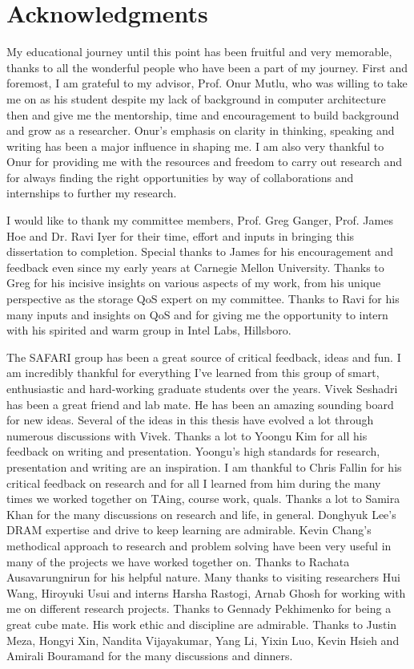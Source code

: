 \chapter*{Acknowledgments}
My educational journey until this point has been fruitful and very
memorable, thanks to all the wonderful people who have been a part
of my journey. First and foremost, I am grateful to my advisor,
Prof. Onur Mutlu, who was willing to take me on as his student
despite my lack of background in computer architecture then and
give me the mentorship, time and encouragement to build
background and grow as a researcher. Onur's emphasis on clarity in
thinking, speaking and writing has been a major influence in
shaping me. I am also very thankful to Onur for providing me with
the resources and freedom to carry out research and for always finding
the right opportunities by way of collaborations and internships
to further my research.

I would like to thank my committee members, Prof. Greg Ganger,
Prof. James Hoe and Dr. Ravi Iyer for their time, effort and
inputs in bringing this dissertation to completion. Special thanks
to James for his encouragement and feedback even since my early
years at Carnegie Mellon University. Thanks to Greg for his incisive insights on various
aspects of my work, from his unique perspective as the storage QoS
expert on my committee. Thanks to Ravi for his many inputs and
insights on QoS and for giving me the opportunity to intern with
his spirited and warm group in Intel Labs, Hillsboro. 

The SAFARI group has been a great source of critical feedback,
ideas and fun. I am incredibly thankful for everything I've
learned from this group of smart, enthusiastic and hard-working
graduate students over the years. Vivek Seshadri has been a great
friend and lab mate. He has been an amazing sounding board for new
ideas. Several of the ideas in this thesis have evolved a lot
through numerous discussions with Vivek. Thanks a lot to Yoongu
Kim for all his feedback on writing and presentation. Yoongu's
high standards for research, presentation and writing are an
inspiration. I am thankful to Chris Fallin for his critical
feedback on research and for all I learned from him during the
many times we worked together on TAing, course work, quals. Thanks
a lot to Samira Khan for the many discussions on research and
life, in general. Donghyuk Lee's DRAM expertise and drive to keep
learning are admirable. Kevin Chang's methodical approach to
research and problem solving have been very useful in many of the
projects we have worked together on. Thanks to Rachata
Ausavarungnirun for his helpful nature. Many thanks to visiting
researchers Hui Wang, Hiroyuki Usui and interns Harsha Rastogi,
Arnab Ghosh for working with me on different research projects.
Thanks to Gennady Pekhimenko for being a great cube mate. His work
ethic and discipline are admirable. Thanks to Justin Meza,
Hongyi Xin, Nandita Vijayakumar, Yang Li, Yixin Luo, Kevin Hsieh
and Amirali Bouramand for the many discussions and dinners. 

